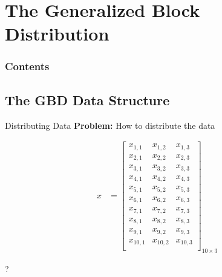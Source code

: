 \section[GBD]{The Generalized Block Distribution}

\hidenum
\begin{frame}[noframenumbering]
\frametitle{Contents}
 \tableofcontents[currentsection,hideothersubsections,sectionstyle=show/hide]
\end{frame}
\shownum


\subsection{The GBD Data Structure}


\begin{frame}
  \begin{block}{Distributing Data}
  \centering
\textbf{Problem:}  How to distribute the data
\begin{center}
    \begin{minipage}{0.47\textwidth}
     \begin{center}
      \begin{align*}
      x &= \left[
            \begin{array}{lll}
            x_{1,1} & x_{1,2} & x_{1,3} \\
            x_{2,1} & x_{2,2} & x_{2,3} \\
            x_{3,1} & x_{3,2} & x_{3,3} \\
            x_{4,1} & x_{4,2} & x_{4,3} \\
            x_{5,1} & x_{5,2} & x_{5,3} \\
            x_{6,1} & x_{6,2} & x_{6,3} \\
            x_{7,1} & x_{7,2} & x_{7,3} \\
            x_{8,1} & x_{8,2} & x_{8,3} \\
            x_{9,1} & x_{9,2} & x_{9,3} \\
            x_{10,1} & x_{10,2} & x_{10,3} \\
            \end{array}
      \right]_{10\times 3}
      \end{align*}
     \end{center}
    \end{minipage}
    \begin{minipage}{0.47\textwidth}
    \centering
      {\fontsize{12cm}{1cm}\selectfont ? }
    \end{minipage}
    \end{center}
  \end{block}
\end{frame}



